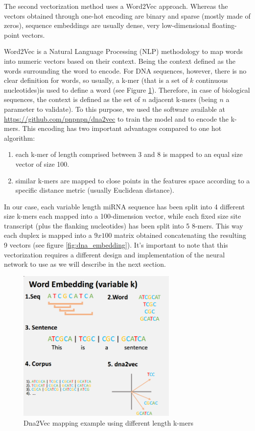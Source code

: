 The second vectorization method uses a Word2Vec approach. Whereas the vectors obtained through one-hot encoding are binary and sparse (mostly made of zeros), sequence embeddings are usually dense, very low-dimensional floating-point vectors. 

Word2Vec \cite{word2vec} is a Natural Language Processing (NLP) methodology to map words into numeric vectors based on their context. Being the context defined as the words surrounding the word to encode. For DNA sequences, however, there is no clear definition for words, so usually, a k-mer (that is a set of $k$ continuous nucleotides)is used to define a word (see Figure \ref{fig:dna2vec}). Therefore, in case of biological sequences, the context is defined as the set of $n$ adjacent k-mers (being $n$ a parameter to validate). To this purpose, we used the software available at \url{https://github.com/pnpnpn/dna2vec} to train the model and to encode the k-mers. This encoding has two important advantages compared to one hot algorithm:

\begin{enumerate}
	\item each k-mer of length comprised between 3 and 8 is mapped to an equal size vector of size 100.
	\item similar k-mers are mapped to close points in the features space according to a specific distance metric (usually Euclidean distance).
\end{enumerate}

In our case, each variable length miRNA sequence has been split into 4 different size k-mers each mapped into a 100-dimension vector, while each fixed size site transcript (plus the flanking nucleotides) has been split into 5 8-mers. This way each duplex is mapped into a $9x100$ matrix obtained concatenating the resulting 9 vectors (see figure \ref{fig:dna_embedding}). It's important to note that this vectorization requires a different design and implementation of the neural network to use as we will describe in the next section.

\begin{figure}[hbt!]
	\centering
	\includegraphics[width=0.7\textwidth, height=0.3\textheight]{Figures/dna2vec}
	\caption{ Dna2Vec mapping example using different length k-mers}
	\label{fig:dna2vec}
\end{figure}

